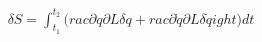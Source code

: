 \documentclass[preview]{standalone}
\begin{document}
\begin{align*}
\delta S = \int_{t_1}^{t_2} \big( rac{\partial q}{\partial L} \delta q + rac{\partial \dot{q}}{\partial L} \delta \dot{q} 
ight) dt
\end{align*}
\end{document}
